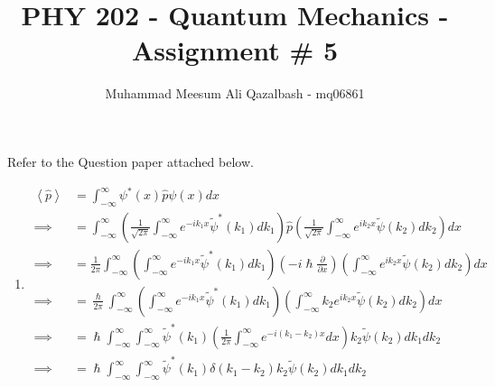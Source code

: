 \documentclass[addpoints]{exam}
\title{PHY 202 - Quantum Mechanics - Assignment \# 5}
\author{Muhammad Meesum Ali Qazalbash - mq06861}
\begin{document}
\maketitle

\begin{questions}
    \question[15] Refer to the Question paper attached below.
    \begin{solution}
        \begin{enumerate}
            \item \begin{equation*}
                      \begin{aligned}
                          \left<\hat{p}\right>          & = \int_{-\infty}^{\infty} \psi^*(x)\hat{p}\psi(x) dx                                                                                                                                                                                  \\
                          \implies                      & = \int_{-\infty}^{\infty} \left(\frac{1}{\sqrt{2\pi}}\int_{-\infty}^{\infty}e^{-ik_1x}\tilde{\psi}^*(k_1)dk_1\right)\hat{p}\left(\frac{1}{\sqrt{2\pi}}\int_{-\infty}^{\infty}e^{ik_2x}\tilde{\psi}(k_2)dk_2\right) dx                 \\
                          \implies                      & = \frac{1}{2\pi}\int_{-\infty}^{\infty} \left(\int_{-\infty}^{\infty}e^{-ik_1x}\tilde{\psi}^*(k_1)dk_1\right)\left(-i\hslash \frac{\partial}{\partial x} \right)\left(\int_{-\infty}^{\infty}e^{ik_2x}\tilde{\psi}(k_2)dk_2\right) dx \\
                          \implies                      & = \frac{\hslash}{2\pi}\int_{-\infty}^{\infty} \left(\int_{-\infty}^{\infty}e^{-ik_1x}\tilde{\psi}^*(k_1)dk_1\right)\left(\int_{-\infty}^{\infty}k_2e^{ik_2x}\tilde{\psi}(k_2)dk_2\right) dx                                           \\
                          \implies                      & = \hslash\int_{-\infty}^{\infty} \int_{-\infty}^{\infty}\tilde{\psi}^*(k_1)\left(\frac{1}{2\pi}\int_{-\infty}^{\infty}e^{-i(k_1-k_2)x}dx\right)k_2 \tilde{\psi}(k_2) dk_1dk_2                                                         \\
                          \implies                      & = \hslash\int_{-\infty}^{\infty} \int_{-\infty}^{\infty}\tilde{\psi}^*(k_1)\delta(k_1-k_2)k_2 \tilde{\psi}(k_2) dk_1dk_2                                                                                                              \\

\end{aligned}
\end{equation*}
\end{enumerate}
\end{solution}
\end{questions}
\end{document}
